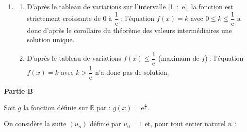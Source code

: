 \documentclass[10pt]{article}
\providecommand{\R}{\mathbb{R}}
\begin{document}
\begin{enumerate}
\begin{enumerate}
		\item $f(1)=0$ et $f(\text e) = \dfrac{1}{\text e}$; on dresse le tableau de variations  de la fonction $f$ sur $[1~;~+\infty[$.

\begin{center}
{\renewcommand{\arraystretch}{1.1}
\def\esp{\hspace*{2.5cm}}
\def\hauteur{0pt}
$\begin{array}{|c|*5{c}|}
\hline
x & 1  & \esp & \text e & \esp & +\infty \\ 
\hline
f'(x) &  &   \pmb{+} & \vline\hspace{-2.7pt}0 & \pmb{-} & \\ 
\hline
 & &  &   \Rnode{max}{\frac{1}{\text e}}  &  &   \\  
f(x) & &     &  &  &  \rule{0pt}{\hauteur} \\ 
 & \Rnode{min1}{0} &   &  &  &   \Rnode{min2}{0} \rule{0pt}{\hauteur}    
 \ncline{->}{min1}{max} 
 \ncline{->}{max}{min2} 
 \\ 
\hline
\end{array} $
}
\end{center}	

	\end{enumerate}
\item 
	\begin{enumerate}
		\item 
D'après le tableau de variations sur l'intervalle [1~;~e], la fonction est strictement croissante de $0$ à $\dfrac{1}{\text{e}}$ : l'équation $f(x) = k$ avec $0 \leqslant k \leqslant \dfrac{1}{\text{e}}$ a donc d'après le corollaire du théorème des valeurs intermédiaires une solution unique.

		\item 


D'après le tableau de variations $f(x) \leqslant \dfrac{1}{\text{e}}$ (maximum de $f$) : l'équation $f(x) = k$ avec $k > \dfrac{1}{\text{e}}$ n'a donc pas de solution.
	\end{enumerate}
\end{enumerate}

\bigskip

\textbf{Partie B}

\medskip

Soit $g$ la fonction définie sur $\R$ par : 
$g(x) = \text{e}^{\frac{x}{4}}.$

On considère la suite $\left(u_n\right)$ définie par $u_0 = 1$ et, pour tout entier naturel $n$ :
\end{document}
